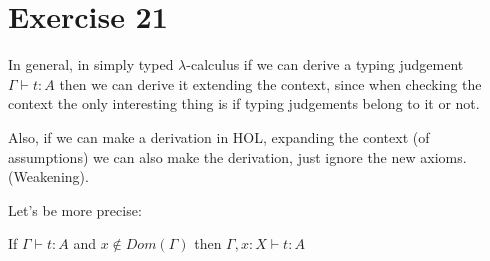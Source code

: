 \section{Exercise 21}

In general, in simply typed $\lambda$-calculus
if we can derive a typing judgement $\Gamma \vdash t : A$
then we can derive it extending the context, since when checking the context
the only interesting thing is if typing judgements belong to it
or not.

Also, if we can make a derivation in HOL,
expanding the context (of assumptions) we can also make the derivation,
just ignore the new axioms. (Weakening).

Let's be more precise:

\begin{lemma} 
  
  If $\Gamma \vdash t : A$ and $x \notin Dom(\Gamma)$
  then $\Gamma, x:X \vdash t : A$
\end{lemma}
